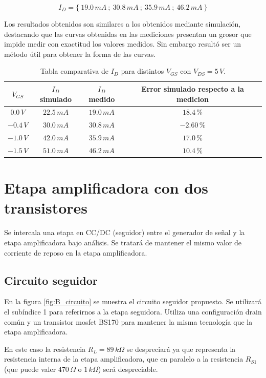\documentclass[10pt,spanish,a4paper,notitlepage]{article}
\begin{document}
\[ \displaystyle I_D = \{\ 19.0\,\unit{mA} \ ;\ 30.8\,\unit{mA} \ ;\ 35.9\,\unit{mA} \ ;\ 46.2\,\unit{mA} \ \} \]

Los resultados obtenidos son similares a los obtenidos mediante simulación, 
destacando que las curvas obtenidas en las mediciones presentan un grosor
que impide medir con exactitud los valores medidos. Sin embargo
resultó ser un método útil para obtener la forma de las curvas.

\begin{table}[H]
\centering
\begin{tabular}{|c|c|c|c|}
\hline
$V_{GS}$ & $I_D$ simulado & $I_D$ medido  & Error simulado respecto a la medicion \\ \hline
$0.0\,\unit{V}$ & $22.5\,\unit{mA}$ & $19.0\,\unit{mA}$ & $18.4\,\unit{\%}$ \\ \hline
$-0.4\,\unit{V}$ & $30.0\,\unit{mA}$ & $30.8\,\unit{mA}$ & $-2.60\,\unit{\%}$ \\ \hline
$-1.0\,\unit{V}$ & $42.0\,\unit{mA}$ & $35.9\,\unit{mA}$ & $17.0\,\unit{\%}$ \\ \hline
$-1.5\,\unit{V}$ & $51.0\,\unit{mA}$ & $46.2\,\unit{mA}$ & $10.4\,\unit{\%}$ \\ \hline
\end{tabular}
\caption{Tabla comparativa de $I_D$ para distintos $V_{GS}$ con $V_{DS} = 5\,\unit{V}$.}
\label{table:2_comparacion_ID}
\end{table}

\section{Etapa amplificadora con dos transistores}

Se intercala una etapa en CC/DC (seguidor) entre el generador de señal
y la etapa amplificadora bajo análisis. Se tratará de mantener el mismo
valor de corriente de reposo en la etapa amplificadora. 

\subsection{Circuito seguidor}

En la figura \ref{fig:B_circuito} se muestra el circuito seguidor propuesto. Se utilizará el subíndice 1 para referirnos a la etapa seguidora.
Utiliza una configuración drain común y un transistor mosfet BS170
para mantener la misma tecnología que la etapa amplificadora.

En este caso la resistencia $R_L = 89\,\unit{k\Omega}$ se
despreciará ya que representa la resistencia interna de la etapa
amplificadora, que en paralelo a la resistencia $R_{S1}$ (que puede valer $470\,\unit{\Omega}$ o $1\,\unit{k\Omega}$) será
despreciable.
\end{document}
